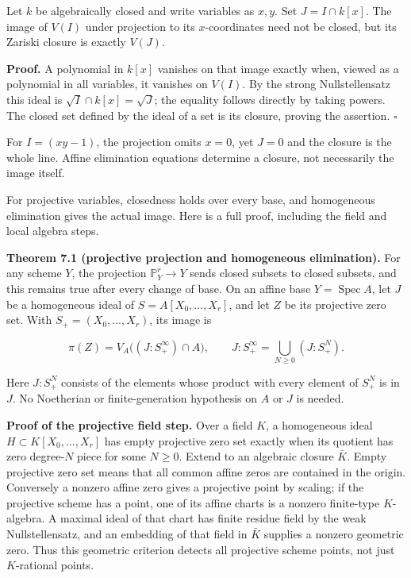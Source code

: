 \documentclass[
]{article}
\begin{document}
Let \(k\) be algebraically closed and write variables as \(x,y\). Set
\(J=I\cap k[x]\). The image of \(V(I)\) under projection to its
\(x\)-coordinates need not be closed, but its Zariski closure is exactly
\(V(J)\).

\textbf{Proof.} A polynomial in \(k[x]\) vanishes on that image exactly
when, viewed as a polynomial in all variables, it vanishes on \(V(I)\).
By the strong Nullstellensatz this ideal is
\(\sqrt I\cap k[x]=\sqrt J\); the equality follows directly by taking
powers. The closed set defined by the ideal of a set is its closure,
proving the assertion. \(\square\)

For \(I=(xy-1)\), the projection omits \(x=0\), yet \(J=0\) and the
closure is the whole line. Affine elimination equations determine a
closure, not necessarily the image itself.

For projective variables, closedness holds over every base, and
homogeneous elimination gives the actual image. Here is a full proof,
including the field and local algebra steps.

\textbf{Theorem 7.1 (projective projection and homogeneous
elimination).} For any scheme \(Y\), the projection
\(\mathbb P^r_Y\to Y\) sends closed subsets to closed subsets, and this
remains true after every change of base. On an affine base
\(Y=\operatorname{Spec}A\), let \(J\) be a homogeneous ideal of
\(S=A[X_0,\ldots,X_r]\), and let \(Z\) be its projective zero set. With
\(S_+=(X_0,\ldots,X_r)\), its image is

\[
\pi(Z)=V_A\bigl((J:S_+^\infty)\cap A\bigr),
\qquad
J:S_+^\infty=\bigcup_{N\ge0}(J:S_+^N).
\tag{10}
\]

Here \(J:S_+^N\) consists of the elements whose product with every
element of \(S_+^N\) is in \(J\). No Noetherian or finite-generation
hypothesis on \(A\) or \(J\) is needed.

\textbf{Proof of the projective field step.} Over a field \(K\), a
homogeneous ideal \(H\subset K[X_0,\ldots,X_r]\) has empty projective
zero set exactly when its quotient has zero degree-\(N\) piece for some
\(N\ge0\). Extend to an algebraic closure \(\bar K\). Empty projective
zero set means that all common affine zeros are contained in the origin.
Conversely a nonzero affine zero gives a projective point by scaling; if
the projective scheme has a point, one of its affine charts is a nonzero
finite-type \(K\)-algebra. A maximal ideal of that chart has finite
residue field by the weak Nullstellensatz, and an embedding of that
field in \(\bar K\) supplies a nonzero geometric zero. Thus this
geometric criterion detects all projective scheme points, not just
\(K\)-rational points.
\end{document}
